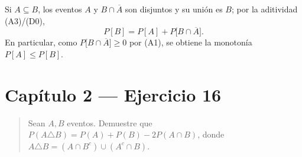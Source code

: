 \documentclass[11pt]{article}
\begin{document}
\begin{resp}
Si $A\subseteq B$, los eventos $A$ y $B\cap\overline{A}$ son disjuntos y su unión es $B$; por la
aditividad (A3)/(D0),
\[
\boxed{\;P[B]=P[A]+P\big[B\cap\overline{A}\big].\;}
\]
En particular, como $P\big[B\cap\overline{A}\big]\ge 0$ por (A1), se obtiene la monotonía
$P[A]\le P[B]$.
\end{resp}

\section*{Capítulo 2 --- Ejercicio 16}

\begin{quote}
Sean $A,B$ eventos. Demuestre que $P(A\triangle B)=P(A)+P(B)-2P(A\cap B)$, donde
$A\triangle B=(A\cap B^{c})\cup(A^{c}\cap B)$.
\end{quote}
\end{document}
